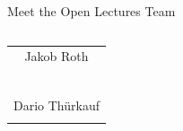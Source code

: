 \documentclass[handout]{beamer}
\begin{document}
\begin{frame}{Meet the Open Lectures Team}
\begin{columns}[T]
\begin{column}{0.33\textwidth}
\begin{table}
\begin{tabular}{c}
					Jakob Roth\\
					\href{https://linkedin.com/in/jakob-roth}{\faLinkedinSquare}\ \href{https://twitter.com/jakob_rouge}{\faTwitterSquare}\\
					\vspace{0.5em}\\
					Dario Thürkauf\\
					\href{https://linkedin.com/in/dario-thuerkauf/}{\faLinkedinSquare} \href{https://twitter.com/dario_thuerkauf}{\faTwitterSquare}\\
				\end{tabular}
			\end{table}
		\end{column}
	\end{columns}
\end{frame}
\end{document}
